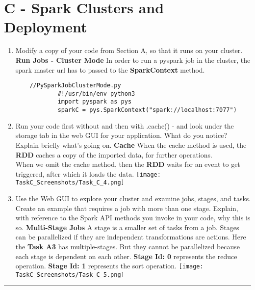 \documentclass[12pt]{article}
\begin{document}
\section{C - Spark Clusters and Deployment}
\begin{enumerate}
\item Modify a copy of your code from Section A, so that it runs on your cluster.
\newline
\newline
	\textbf{Run Jobs - Cluster Mode}
    \newline
    	In order to run a pyspark job in the cluster, the spark master url has to passed to the \textbf{SparkContext} method. \\
    \begin{lstlisting}
    //PySparkJobClusterMode.py
        	#!/usr/bin/env python3
        	import pyspark as pys
            sparkC = pys.SparkContext("spark://localhost:7077")
    \end{lstlisting}
\item Run your code first without and then with .cache() - and look under the storage tab in the web GUI for your application. What do you notice? Explain briefly what’s going on.
\newline
\newline
	\textbf{Cache}
    	When the cache method is used, the \textbf{RDD} caches a copy of the imported data, for further operations. \\
        When we omit the cache method, then the \textbf{RDD} waits for an event to get triggered, after which it loads the data. \cite{CA}
	\newline
    \newline
	\texttt{[image: TaskC\_Screenshots/Task\_C\_4.png]}
\newpage
\item Use the Web GUI to explore your cluster and examine jobs, stages, and tasks. Create an example that requires a job with more than one stage. Explain, with reference to the Spark API methods you invoke in your code, why this is so.
\newline
\newline
	\textbf{Multi-Stage Jobs}
    \newline
    	A stage is a smaller set of tasks from a job. Stages can be parallelized if they are independent transformations are actions. \cite{ST}
	\newline
    \newline
    	Here the \textbf{Task A3} has multiple-stages. But they cannot be parallelized because each stage is dependent on each other. \textbf{Stage Id: 0} represents the reduce operation. \textbf{Stage Id: 1} represents the sort operation.
     \newline
     \newline
     \texttt{[image: TaskC\_Screenshots/Task\_C\_5.png]}
\end{enumerate}
\hrule
\newpage


\end{document}
